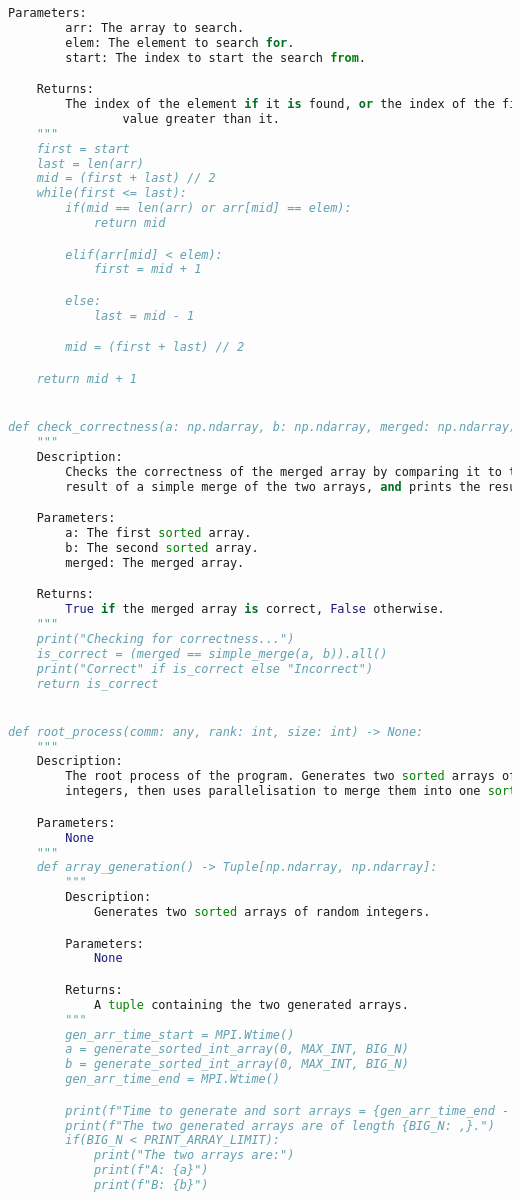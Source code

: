 \documentclass[12pt]{article}
\begin{document}
{\begin{lstlisting}[language={Python}]
    Parameters:
        arr: The array to search.
        elem: The element to search for.
        start: The index to start the search from.

    Returns:
        The index of the element if it is found, or the index of the first
                value greater than it.
    """
    first = start
    last = len(arr)
    mid = (first + last) // 2
    while(first <= last):
        if(mid == len(arr) or arr[mid] == elem):
            return mid

        elif(arr[mid] < elem):
            first = mid + 1

        else:
            last = mid - 1

        mid = (first + last) // 2

    return mid + 1


def check_correctness(a: np.ndarray, b: np.ndarray, merged: np.ndarray) -> bool:
    """
    Description:
        Checks the correctness of the merged array by comparing it to the
        result of a simple merge of the two arrays, and prints the result.

    Parameters:
        a: The first sorted array.
        b: The second sorted array.
        merged: The merged array.

    Returns:
        True if the merged array is correct, False otherwise.
    """
    print("Checking for correctness...")
    is_correct = (merged == simple_merge(a, b)).all()
    print("Correct" if is_correct else "Incorrect")
    return is_correct


def root_process(comm: any, rank: int, size: int) -> None:
    """
    Description:
        The root process of the program. Generates two sorted arrays of random
        integers, then uses parallelisation to merge them into one sorted array.

    Parameters:
        None
    """
    def array_generation() -> Tuple[np.ndarray, np.ndarray]:
        """
        Description:
            Generates two sorted arrays of random integers.

        Parameters:
            None

        Returns:
            A tuple containing the two generated arrays.
        """
        gen_arr_time_start = MPI.Wtime()
        a = generate_sorted_int_array(0, MAX_INT, BIG_N)
        b = generate_sorted_int_array(0, MAX_INT, BIG_N)
        gen_arr_time_end = MPI.Wtime()

        print(f"Time to generate and sort arrays = {gen_arr_time_end - gen_arr_time_start: .4f} seconds.\n")
        print(f"The two generated arrays are of length {BIG_N: ,}.")
        if(BIG_N < PRINT_ARRAY_LIMIT):
            print("The two arrays are:")
            print(f"A: {a}")
            print(f"B: {b}")


\end{lstlisting}}
\end{document}
